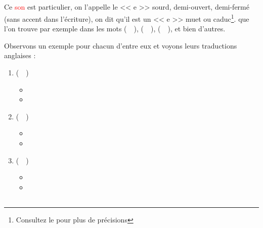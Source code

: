 \subsection{}\label{subsec:əfr}

Ce \textcolor{red}{son} est particulier, on l'appelle le << e >> sourd, demi-ouvert,
demi-fermé (sans accent dans l'écriture), on dit qu'il est un << e >>
muet ou caduc\footnote{Consultez le \GE pour plus de
  précisions}. 
que l'on trouve par exemple dans les mots
 (~~),  (~~),  (~~), et bien d'autres.

Observons un exemple pour chacun d'entre eux et voyons leurs
traductions anglaises :\par

\begin{enumerate}
\item {} (~~)
  \begin{itemize}
  \item {}
    \item {}
    \end{itemize}
    
\item {} (~~)
  \begin{itemize}
  \item {}
  \item {}
  \end{itemize}

  
\item {} (~~)
  \begin{itemize}
  \item {}
  \item {}
  \end{itemize}
   
\end{enumerate}

\subsection{}\label{subsec:ifr}

